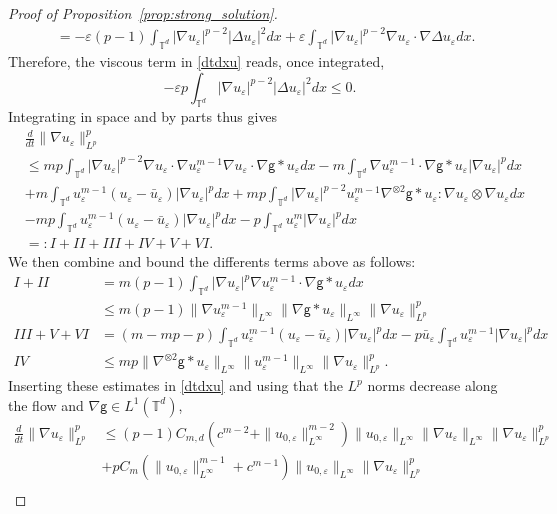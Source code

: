 \documentclass[11pt]{article}
\numberwithin{equation}{section} %
\newcommand{\T}{{\mathbb{T}}}
\newcommand{\g}{{\mathsf{g}}}
\newcommand{\D}{\Delta}
\newcommand{\ep}{\varepsilon}
\def \ep{\varepsilon}
\def\nab{\nabla}
\begin{document}
\begin{proof}[Proof of Proposition~\ref{prop:strong_solution}]
\begin{align*}
    &=  -\ep (p-1) \int_{\T^d}|\nab u_\ep|^{p-2} |\D u_\ep|^2 dx  +\ep \int_{\T^d} |\nab u_\ep|^{p-2}\nab u_\ep \cdot \nab \D u_\ep dx.
    \end{align*}
    Therefore, the viscous term in \eqref{dtdxu} reads, once integrated,
    \begin{equation*}
        -\ep p  \int_{\T^d}|\nab u_\ep|^{p-2} |\D u_\ep|^2 dx \le 0.
    \end{equation*} 
    Integrating in space and by parts thus gives
    \begin{align*}
        &\frac{d}{dt}\|\nab u_\ep \|_{L^p}^p \\
        &\le mp\int_{\T^d} |\nab u_\ep|^{p-2}\nab u_\ep\cdot \nab u_\ep^{m-1} \nab u_\ep\cdot \nab\g\ast u_\ep dx  -m\int_{\T^d} \nab u^{m-1}_\ep\cdot\nab\g\ast u_\ep |\nab u_\ep|^p dx \\
        &+ m\int_{\T^d} u_\ep^{m-1}(u_\ep-\bar u_\ep) |\nab u_\ep|^p dx + mp \int_{\T^d} |\nab u_\ep|^{p-2} u_\ep^{m-1}\nab^{\otimes 2}\g\ast u_\ep : \nab u_\ep\otimes \nab u_\ep dx \\
        &-mp\int_{\T^d} u_\ep^{m-1}(u_\ep - \bar u_\ep) |\nab u_\ep|^p dx - p \int_{\T^d} u_\ep^m |\nab u_\ep|^p dx \\
        &=: I + II+ III+ IV + V + VI.
    \end{align*}
    We then combine and bound the differents terms above as follows:
    \begin{align}\label{ineq:I-VI}
        I +II &= m(p-1) \int_{\T^d} |\nab u_\ep|^p \nab u_\ep^{m-1}\cdot\nab \g\ast u_\ep dx \\ &\le m(p-1) \|\nab u_\ep^{m-1}\|_{L^\infty} \|\nab \g\ast u_\ep\|_{L^\infty} \|\nab u_\ep\|_{L^p}^p \nonumber \\
        III + V+ VI &= (m-mp-p)\int_{\T^d} u_\ep^{m-1}(u_\ep - \bar u_\ep) |\nab u_\ep|^p dx - p\bar u_\ep \int_{\T^d} u_\ep^{m-1} |\nab u_\ep|^p dx \nonumber\\
        IV  &\le mp \|\nab^{\otimes 2}\g\ast u_\ep\|_{L^\infty} \| u_\ep^{m-1}\|_{L^\infty} \|\nab u_\ep\|_{L^p}^p.\nonumber
    \end{align}
    Inserting these estimates in \eqref{dtdxu} and using that the $L^p$ norms decrease along the flow and $\nab \g \in L^1(\T^d)$,
    \begin{align*}
        \frac{d}{dt}\| \nab u_\ep \|_{L^p}^p &\le (p-1) C_{m,d} (c^{m-2}+\|u_{0,\ep}\|_{L^\infty}^{m-2})\|u_{0,\ep}\|_{L^\infty} \| \nab u_\ep \|_{L^\infty} \|\nab u_\ep\|_{L^p}^p \\
        & + pC_{m} (\|u_{0,\ep}\|_{L^\infty}^{m-1}+c^{m-1}) \| u_{0,\ep}\|_{L^\infty} \|\nab u_\ep\|_{L^p}^p   \\

\end{align*}
\end{proof}
\end{document}
